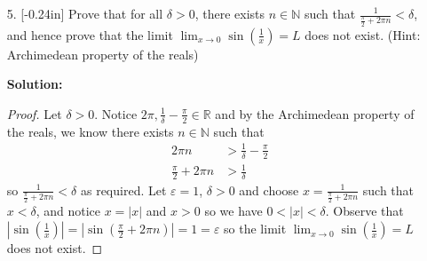\documentclass[letterpaper,12pt]{article}
\theoremstyle{definition}
\begin{document}
\begin{enumerate}
    \item[5.] \reversemarginpar{}[-0.24in] Prove that for all $\delta > 0$, there exists $n \in \mathbb{N}$ such that $\frac{1}{\frac{\pi}{2}+2\pi n} < \delta$, and hence prove that the limit $\lim_{x \rightarrow 0} \sin \left (\frac{1}{x} \right ) = L$ does not exist. (Hint: Archimedean property of the reals)
    \begin{mdframed}
        \textbf{Solution:}
        \begin{proof}
           Let $\delta > 0$. Notice $2\pi , \frac{1}{\delta} - \frac{\pi}{2} \in \mathbb{R}$ and by the Archimedean property of the reals, we know there exists $n \in \mathbb{N}$ such that \begin{align*}
               2\pi n &> \frac{1}{\delta} - \frac{\pi}{2} \\
             \frac{\pi}{2} + 2\pi n &> \frac{1}{\delta} 
           \end{align*}
           so $\frac{1}{\frac{\pi}{2}+2\pi n} < \delta$ as required. Let $\varepsilon = 1$, $\delta > 0$ and choose $x = \frac{1}{\frac{\pi}{2}+2\pi n}$ such that $x < \delta$, and notice $x = |x|$ and $x > 0$ so we have $0 < |x| < \delta$. Observe that $\left |\sin \left ( \frac{1}{x} \right ) \right |=  \left | \sin \left (  \frac{\pi}{2}+2\pi n \right ) \right | = 1 = \varepsilon$ so the limit $\lim_{x \rightarrow 0} \sin \left (\frac{1}{x} \right ) = L$ does not exist.
        \end{proof}
    \end{mdframed}
\end{enumerate}
\end{document}
